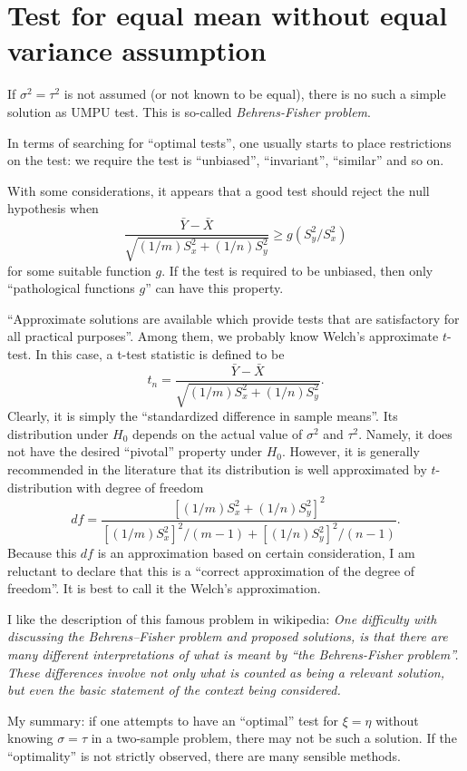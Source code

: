 \section{Test for equal mean without equal variance assumption}

If $\sigma^2 = \tau^2$ is not assumed (or not known to be equal),
there is no such a simple solution as UMPU test.
This is so-called {\it Behrens-Fisher problem}.

In terms of searching for ``optimal tests'', one usually starts to
place restrictions on the test: we require the test is ``unbiased'',
``invariant'', ``similar'' and so on. 

With some considerations, it appears that a good test should reject
the null hypothesis when
\[
\frac{\bar Y - \bar X}{\sqrt{(1/m)S_x^2 + (1/n)S_y^2}} \geq g(S_y^2/S_x^2)
\]
for some suitable function $g$.
If the test is required to be unbiased, then only ``pathological functions
$g$'' can have this property.

``Approximate solutions are available which provide tests that are
satisfactory for all practical purposes''. Among them, we probably
know Welch's approximate $t$-test. In this case, a t-test statistic
is defined to be
\[
t_n = \frac{\bar Y - \bar X}{\sqrt{(1/m)S_x^2 + (1/n)S_y^2}}.
\]
Clearly, it is simply the ``standardized difference in sample means''.
Its distribution under $H_0$ depends on the actual value of
$\sigma^2$ and $\tau^2$. Namely, it does not have the desired ``pivotal''
property under $H_0$. 
However, it is generally recommended in the
literature that its distribution is well approximated by
$t$-distribution with degree of freedom
\[
df = 
\frac{[(1/m)S_x^2 + (1/n)S_y^2]^2}
{[(1/m)S_x^2]^2/(m-1) + [(1/n)S_y^2]^2/(n-1)}.
\]
Because this $df$ is an approximation based on certain consideration,
I am reluctant to declare that this is a ``correct approximation
of the degree of freedom''.
It is best to call it the Welch's approximation.

I like the description of this famous problem in wikipedia:
{\it
One difficulty with discussing the Behrens--Fisher problem and proposed solutions, 
is that there are many different interpretations of what is meant by
``the Behrens-Fisher problem''. 
These differences involve not only what is counted as being a relevant solution, 
but even the basic statement of the context being considered.}

My summary: if one attempts to have an ``optimal'' test for
$\xi = \eta$ without knowing $\sigma = \tau$ in a two-sample problem,
there may not be such a solution.
If the ``optimality'' is not strictly observed, there are many sensible
methods.


